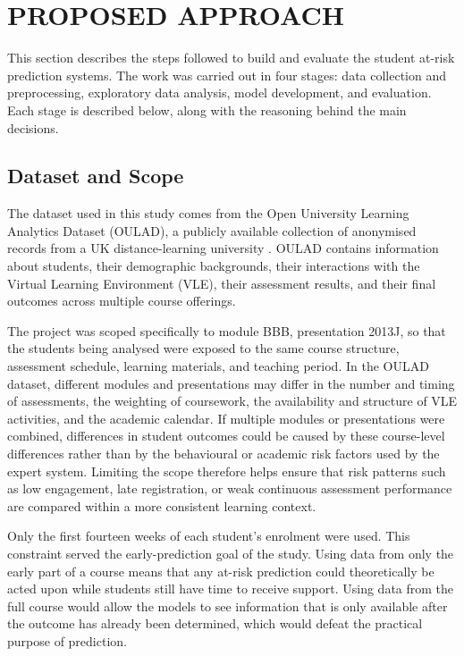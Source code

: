 \section{PROPOSED APPROACH}

This section describes the steps followed to build and evaluate the student at-risk prediction systems. The work was carried out in four stages: data collection and preprocessing, exploratory data analysis, model development, and evaluation. Each stage is described below, along with the reasoning behind the main decisions.

\subsection{Dataset and Scope}

The dataset used in this study comes from the Open University Learning Analytics Dataset (OULAD), a publicly available collection of anonymised records from a UK distance-learning university \parencite{kuzilek2017oulad}. OULAD contains information about students, their demographic backgrounds, their interactions with the Virtual Learning Environment (VLE), their assessment results, and their final outcomes across multiple course offerings.

The project was scoped specifically to module BBB, presentation 2013J, so that the students being analysed were exposed to the same course structure, assessment schedule, learning materials, and teaching period. In the OULAD dataset, different modules and presentations may differ in the number and timing of assessments, the weighting of coursework, the availability and structure of VLE activities, and the academic calendar. If multiple modules or presentations were combined, differences in student outcomes could be caused by these course-level differences rather than by the behavioural or academic risk factors used by the expert system. Limiting the scope therefore helps ensure that risk patterns such as low engagement, late registration, or weak continuous assessment performance are compared within a more consistent learning context.

Only the first fourteen weeks of each student's enrolment were used. This constraint served the early-prediction goal of the study. Using data from only the early part of a course means that any at-risk prediction could theoretically be acted upon while students still have time to receive support. Using data from the full course would allow the models to see information that is only available after the outcome has already been determined, which would defeat the practical purpose of prediction.

